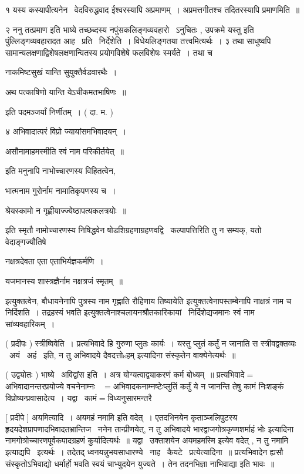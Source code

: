 \documentclass[11pt, openany]{book}
\begin{document}
१ यस्य कस्यापीत्यनेन \textendash\ वेदविरुद्धवाद ईश्वरस्यापि अप्रमाणम्~। 
अप्रमत्तगीतश्च तदितरस्यापि प्रमाणमिति~॥ 

२ ननु {\qt तत्प्रमाण इति भाष्ये तच्छब्दस्य नपुंसकलिङ्गव्यवहारो} \textendash\ ऽनुचितः ,
उपक्रमे {\qt यस्तु} इति पुंल्लिङ्गव्यवहारादत आह \textendash\ प्रति \textendash\ निर्देशेति~। 
विधेयलिङ्गतया तत्त्वमित्यर्थः~। ३ तथा साधुष्वपि
सामान्यलक्षणाद्विशेषलक्षणान्वितस्य प्रयोगविशेषे फलविशेषः स्मर्यते~। तथा
च \textendash\ 

नाकमिष्टसुखं यान्ति सुयुक्तैर्वडवारथैः~। 

अथ पत्काषिणो यान्ति येऽचीकमतभाषिणः~॥

इति पदमञ्जर्यां निर्णीतम्~। ( दा. म. ) 

४ अभिवादात्परं विप्रो ज्यायांसमभिवादयन्~। 

असौनामाहमस्मीति स्वं नाम परिकीर्तयेत्~॥ 

इति मनुनापि नाभोच्चारणस्य विहितत्वेन, 

भात्मनाम गुरोर्नाम नामातिकृपणस्य च~। 

श्रेयस्कामो न गृह्णीयाज्ज्येष्ठापत्यकलत्रयोः~॥ 

इति स्मृतौ नामोच्चारणस्य निषिद्धवेन षोडशिग्रहणाग्रहणवद्वि \textendash\ 
कल्पापत्तिरिति तु न सम्यक्, यतो वेदाङ्गज्यौतिषे \textendash\ 

नक्षत्रदेवता एता एताभिर्यज्ञकर्मणि~। 

यजमानस्य शास्त्रज्ञैर्नाम नक्षत्रजं स्मृतम्~॥

इत्युक्तत्वेन, बौधायनेनापि {\qt पुत्रस्य नाम गृह्णाति रौहिणाय तिष्यायेति}
इत्युक्तत्वेनापस्तम्बेनापि {\qt नाक्षत्रं नाम च निर्दिशति~। तद्रहस्यं
भवति} इत्युक्तत्वेनाश्चलायनश्रौतकारिकायां \textendash\ {\qt निर्दिशेद्यजमानः} स्वं नाम
सांव्यवहारिकम्~। 





 ( प्रदीपः ) स्त्रीष्विवेति~। प्रत्यभिवादे हि गुरुणा प्लुतः कार्यः~। 
यस्तु प्लुतं कर्तुं न जानाति स स्त्रीवद्वक्तव्यः \textendash\ अयं \textendash\ अहं \textendash\ इति, न तु
{\qt अभिवादये दैवदत्तोsहम्} इत्यादिना संस्कृतेन वाक्येनेत्यर्थः~॥ 

 ( उद्व्योतः ) भाष्ये \textendash\ अविद्वांस इति~। अत्र योग्यत्वाद्व्याकरणं कर्म
बोध्यम्~॥ प्रत्यभिवादे$=$अभिवादानन्तरप्रयोज्ये
वचनेनाम्नः \textendash\ $=$अभिवादकनाम्नष्टेःप्लुतिं कर्तुं ये न जानन्ति तेषु कामं
निःशङ्कं विप्रोष्यन्प्रवासादेत्य~। यद्वा \textendash\ कामं$=$विध्यनुसारमन्तरै \textendash\ 



 [ प्रदीपे ] अयमित्यादि~। {\qt अयमहं नमामि} इति वदेत्~। एतदभिनयेन
कृताञ्जलिपुटस्य हृदयदेशप्रापणादभिवादतभ्रान्तिज \textendash\ ननेन तान्प्रीणयेत्, न तु
{\qt अभिवादये भारद्वाजगोत्रकृप्णशर्माहं भोः इत्यादिना
नामगोत्रोच्चारणपूर्वकपादग्रहणं कुर्यादित्यर्थः~॥ यद्वा \textendash\ उक्ताशयेन
अयमहमस्मि} इत्येव वदेत् , न तु {\qt नमामि} इत्याद्यपि \textendash\ इत्यर्थः~। तदेतद्
ध्वनयन्नुभयसाधारण्ये \textendash\ नाह \textendash\ कैयटे \textendash\ प्रत्येत्यादिना~॥ प्रत्यभिवादेन ह्यसौ
संस्कृतोऽभिवाद्यो धर्मार्हो भवति स्वयं चाभ्युदयेन युज्यते~। तेन
तदनभिज्ञा नाभिवाद्या इति भावः~॥ 
\end{document}
